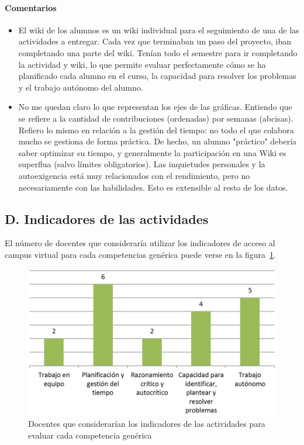 \paragraph*{Comentarios}

\begin{itemize}
\item El wiki de los alumnos es un wiki individual para el seguimiento de una de las actividades a entregar. Cada vez que terminaban un paso del proyecto, iban completando una parte del wiki. Tenían todo el semestre para ir completando la actividad y wiki, lo que permite evaluar perfectamente cómo se ha planificado cada alumno en el curso, la capacidad para resolver los problemas y el trabajo autónomo del alumno.
\item No me quedan claro lo que representan los ejes de las gráficas. Entiendo que se refiere a la cantidad de contribuciones (ordenadas) por semanas (abcisas). Refiero lo mismo en relación a la gestión del tiempo: no todo el que colabora mucho se gestiona de forma práctica. De hecho, un alumno "práctico" debería saber optimizar su tiempo, y generalmente la participación en una Wiki es superflua (salvo límites obligatorios). Las inquietudes personales y la autoexigencia está muy relacionados con el rendimiento, pero no necesariamente con las habilidades. Esto es extensible al resto de los datos.
\end{itemize}

	\subsection*{D. Indicadores de las actividades}

El número de docentes que consideraría utilizar los indicadores de acceso al campus virtual para cada competencias genérica puede verse en la figura~\ref{fig:ape:aa:actividades}.

\begin{figure}[h]
    \includegraphics[scale=0.4]{aa_actividades.png}
  \caption{Docentes que considerarían los indicadores de las actividades para evaluar cada competencia genérica}
  \label{fig:ape:aa:actividades}
\end{figure}

